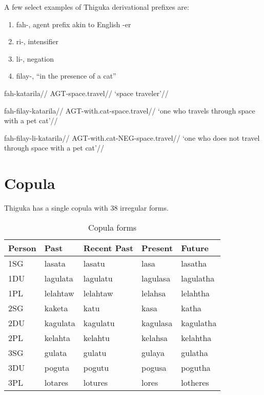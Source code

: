 A few select examples of Thiguka derivational prefixes are:

\begin{enumerate}
    \item fah-, agent prefix akin to English -er
    \item ri-, intensifier
    \item li-, negation
    \item filay-, ``in the presence of a cat''
\end{enumerate}

\ex
\begingl
    \gla  fah-katarila//
    \glb  AGT-space.travel//
    \glft `space traveler'//
\endgl
\xe

\ex
\begingl
    \gla  fah-filay-katarila//
    \glb  AGT-with.cat-space.travel//
    \glft `one who travels through space with a pet cat'//
\endgl
\xe

\ex
\begingl
    \gla  fah-filay-li-katarila//
    \glb  AGT-with.cat-NEG-space.travel//
    \glft `one who does not travel through space with a pet cat'//
\endgl
\xe

\section{Copula}
Thiguka has a single copula with 38 irregular forms.

\begin{table}[h!]
    \centering
    \caption{Copula forms}
    \begin{tabularx}{15cm}{|X|X|X|X|X|}
        \hline
        Person & \textbf{Past} & \textbf{Recent Past} & \textbf{Present} & \textbf{Future} \\
        \hline
        1SG & lasata & lasatu & lasa & lasatha \\
        1DU & lagulata & lagulatu & lagulasa & lagulatha \\
        1PL & lelahtaw & lelahtaw & lelahsa & lelahtha \\
        2SG & kaketa & katu & kasa & katha \\
        2DU & kagulata & kagulatu & kagulasa & kagulatha \\
        2PL & kelahta & kelahtu & kelahsa & kelahtha \\
        3SG & gulata & gulatu & gulaya & gulatha \\
        3DU & poguta & pogutu & pogusa & pogutha \\
        3PL & lotares & lotures & lores & lotheres \\
        \hline
    \end{tabularx}
\end{table}



